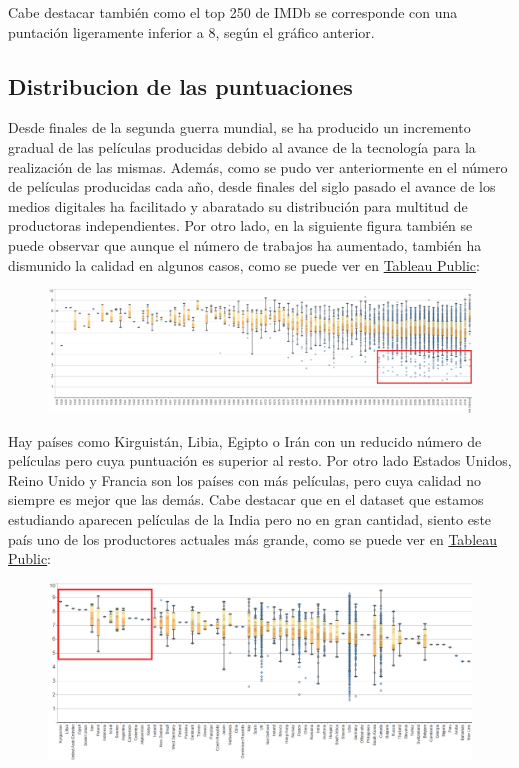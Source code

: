 \documentclass{article}
\begin{document}
Cabe destacar también como el top 250 de IMDb se corresponde con una puntación ligeramente inferior a 8, según el gráfico anterior.

\subsection{Distribucion de las puntuaciones}

Desde finales de la segunda guerra mundial, se ha producido un incremento gradual de las películas producidas debido al avance de la tecnología para la realización de las mismas. Además, como se pudo ver anteriormente en el número de películas producidas cada año, desde finales del siglo pasado el avance de los medios digitales ha facilitado y abaratado su distribución para multitud de productoras independientes\cite{popmatters}. Por otro lado, en la siguiente figura también se puede observar que aunque el número de trabajos ha aumentado, también ha dismunido la calidad en algunos casos, como se puede ver en \href{https://public.tableau.com/profile/javier6580\#!/vizhome/proyecto_fin_de_master_dataset/rating_year}{Tableau Public}:

\begin{figure}[h]
\centering
\includegraphics[width=\textwidth,keepaspectratio]{./images/rating_year}
\end{figure}

Hay países como Kirguistán, Libia, Egipto o Irán con un reducido número de películas pero cuya puntuación es superior al resto. Por otro lado Estados Unidos, Reino Unido y Francia son los países con más películas, pero cuya calidad no siempre es mejor que las demás. Cabe destacar que en el dataset que estamos estudiando aparecen películas de la India pero no en gran cantidad, siento este país uno de los productores actuales más grande, como se puede ver en \href{https://public.tableau.com/profile/javier6580\#!/vizhome/proyecto_fin_de_master_dataset/rating_country}{Tableau Public}:

\begin{figure}[h]
\centering
\includegraphics[width=\textwidth,keepaspectratio]{./images/rating_country}
\end{figure}
\end{document}
